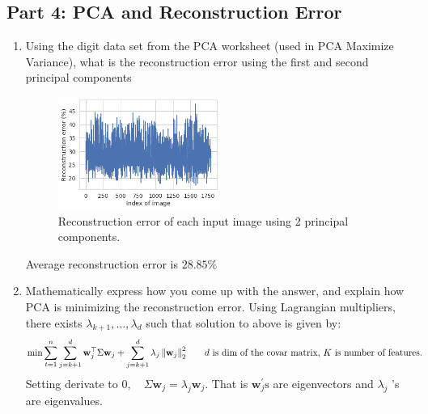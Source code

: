 \subsection{Part 4: PCA and Reconstruction Error}
\begin{enumerate}
    \item Using the digit data set from the PCA worksheet (used in PCA Maximize Variance), what is the reconstruction error using the first and second principal components

\begin{figure}[H]
	\centering
	\includegraphics[width=0.5\textwidth]{templates/digit_reconstruction}
	\caption{Reconstruction error of each input image using 2 principal components.}
	\label{fig:my_label}
\end{figure}
Average reconstruction error is $28.85\%$

        \item  Mathematically express how you come up with the answer, and explain how PCA is minimizing the reconstruction error. 
        \newline \newline
Using Lagrangian multipliers, there exists $\lambda_{k+1}, \ldots, \lambda_{d}$ such that solution to above is given by:
\begin{align*}
\operatorname{min} \sum_{t=1}^{n} \sum_{j=k+1}^{d} \mathbf{w}_{j}^{\top} \Sigma \mathbf{w}_{j}+\sum_{j=k+1}^{d} \lambda_{j}\left\|\mathbf{w}_{j}\right\|_{2}^{2} & \text{\qquad $d$ is dim of the covar matrix, $K$ is number of features.}
\end{align*}        
Setting derivate to $0, \quad \Sigma \mathbf{w}_{j}=\lambda_{j} \mathbf{w}_{j} .$ That is $\mathbf{w}_{j}^{\prime} \mathrm{s}$ are eigenvectors and $\lambda_{j}$ 's are eigenvalues.
\end{enumerate}
